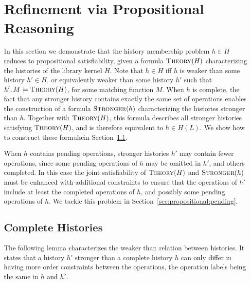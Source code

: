 
\section{Refinement via Propositional Reasoning}
\label{sec:propositional}

In this section we demonstrate that the history membership problem $h \in
\overline{H}$ reduces to propositional satisfiability, given a formula
$\textsc{Theory}(H)$ characterizing the histories of the library kernel $H$.
Note that $h \in \overline{H}$ if{f} $h$ is weaker than some history $h' \in
H$, or equivalently weaker than some history $h'$ such that
$h',M |= \textsc{Theory}(H)$, for some matching function $M$. When
$h$ is complete, the fact that any stronger history contains exactly the same
set of operations enables the construction of a formula $\textsc{Stronger}(h)$
characterizing the histories stronger than $h$. Together with
$\textsc{Theory}(H)$, this formula describes all stronger histories satisfying
$\textsc{Theory}(H)$, and is therefore equivalent to $h \in H(L)$. We show how
to construct these formul\ae in Section~\ref{sec:propositional:complete}.

When $h$ contains pending operations, stronger histories $h'$ may contain fewer
operations, since some pending operations of $h$ may be omitted in $h'$, and
others completed. In this case the joint satisfiability of $\textsc{Theory}(H)$
and $\textsc{Stronger}(h)$ must be enhanced with additional constraints to
ensure that the operations of $h'$ include at least the completed operations of
$h$, and possibly some pending operations of $h$. We tackle this problem in
Section~\ref{sec:propositional:pending}.

\subsection{Complete Histories}
\label{sec:propositional:complete}

The following lemma characterizes the weaker than relation between
histories. It states that a history $h'$ stronger than a complete history $h$
can only differ in having more order constraints between the operations, the
operation labels being the same in $h$ and $h'$.

%
%

